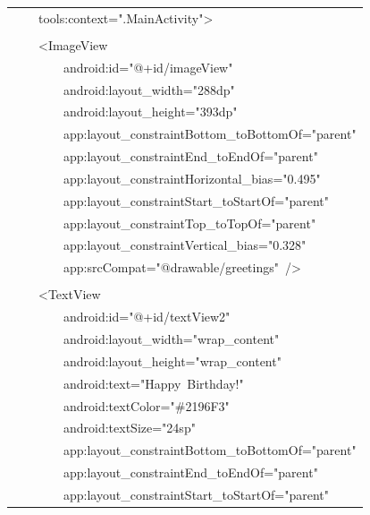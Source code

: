 \documentclass[a4paper,12pt]{article}
\begin{document}
\begin{longtable}{|p{}|}
{\ttfamily\small \ \ \ \ tools:context=".MainActivity"\textgreater{}} \\
\strut \\
{\ttfamily\small \ \ \ \ \textless{}ImageView} \\
{\ttfamily\small \ \ \ \ \ \ \ \ android:id="@+id/imageView"} \\
{\ttfamily\small \ \ \ \ \ \ \ \ android:layout\_width="288dp"} \\
{\ttfamily\small \ \ \ \ \ \ \ \ android:layout\_height="393dp"} \\
{\ttfamily\small \ \ \ \ \ \ \ \ app:layout\_constraintBottom\_toBottomOf="parent"} \\
{\ttfamily\small \ \ \ \ \ \ \ \ app:layout\_constraintEnd\_toEndOf="parent"} \\
{\ttfamily\small \ \ \ \ \ \ \ \ app:layout\_constraintHorizontal\_bias="0.495"} \\
{\ttfamily\small \ \ \ \ \ \ \ \ app:layout\_constraintStart\_toStartOf="parent"} \\
{\ttfamily\small \ \ \ \ \ \ \ \ app:layout\_constraintTop\_toTopOf="parent"} \\
{\ttfamily\small \ \ \ \ \ \ \ \ app:layout\_constraintVertical\_bias="0.328"} \\
{\ttfamily\small \ \ \ \ \ \ \ \ app:srcCompat="@drawable/greetings"\ /\textgreater{}} \\
\strut \\
{\ttfamily\small \ \ \ \ \textless{}TextView} \\
{\ttfamily\small \ \ \ \ \ \ \ \ android:id="@+id/textView2"} \\
{\ttfamily\small \ \ \ \ \ \ \ \ android:layout\_width="wrap\_content"} \\
{\ttfamily\small \ \ \ \ \ \ \ \ android:layout\_height="wrap\_content"} \\
{\ttfamily\small \ \ \ \ \ \ \ \ android:text="Happy\ Birthday!"} \\
{\ttfamily\small \ \ \ \ \ \ \ \ android:textColor="\#2196F3"} \\
{\ttfamily\small \ \ \ \ \ \ \ \ android:textSize="24sp"} \\
{\ttfamily\small \ \ \ \ \ \ \ \ app:layout\_constraintBottom\_toBottomOf="parent"} \\
{\ttfamily\small \ \ \ \ \ \ \ \ app:layout\_constraintEnd\_toEndOf="parent"} \\
{\ttfamily\small \ \ \ \ \ \ \ \ app:layout\_constraintStart\_toStartOf="parent"} \\

\end{longtable}
\end{document}
